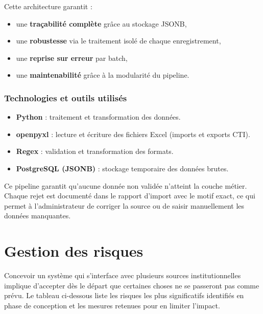 \medskip

Cette architecture garantit :
\begin{itemize}
    \item une \textbf{traçabilité complète} grâce au stockage JSONB,
    \item une \textbf{robustesse} via le traitement isolé de chaque enregistrement,
    \item une \textbf{reprise sur erreur} par batch,
    \item une \textbf{maintenabilité} grâce à la modularité du pipeline.
\end{itemize}

\subsubsection{Technologies et outils utilisés}
\begin{itemize}
    \item \textbf{Python} : traitement et transformation des données.
    \item \textbf{openpyxl} : lecture et écriture des fichiers Excel (imports et exports CTI).
    \item \textbf{Regex} : validation et transformation des formats.
    \item \textbf{PostgreSQL (JSONB)} : stockage temporaire des données brutes.
\end{itemize}

\medskip
Ce pipeline garantit qu'aucune donnée non validée n'atteint la couche métier. Chaque rejet est documenté dans le rapport d'import avec le motif exact, ce qui permet à l'administrateur de corriger la source ou de saisir manuellement les données manquantes.


\section{Gestion des risques}

Concevoir un système qui s'interface avec plusieurs sources institutionnelles implique d'accepter dès le départ que certaines choses ne se passeront pas comme prévu. Le tableau ci-dessous liste les risques les plus significatifs identifiés en phase de conception et les mesures retenues pour en limiter l'impact.

